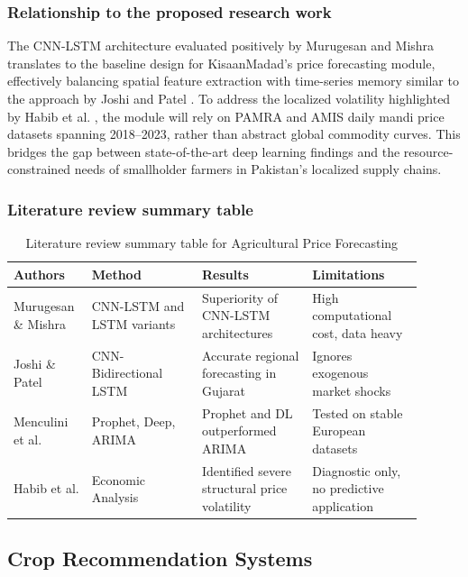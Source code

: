 \documentclass{FastFyp}
\begin{document}
\subsubsection{Relationship to the proposed research work}
The CNN-LSTM architecture evaluated positively by Murugesan and Mishra \cite{murugesan2022forecasting} translates to the baseline design for KisaanMadad's price forecasting module, effectively balancing spatial feature extraction with time-series memory similar to the approach by Joshi and Patel \cite{joshi2022cnn}. To address the localized volatility highlighted by Habib et al. \cite{habib2021impact}, the module will rely on PAMRA and AMIS daily mandi price datasets spanning 2018--2023, rather than abstract global commodity curves. This bridges the gap between state-of-the-art deep learning findings and the resource-constrained needs of smallholder farmers in Pakistan's localized supply chains.

\subsubsection{Literature review summary table}
\begin{table}[htbp]
  \centering
  \caption{Literature review summary table for Agricultural Price Forecasting}
  \label{tab:price_forecasting}
  \begin{tabular}{p{0.15\linewidth} p{0.25\linewidth} p{0.25\linewidth} p{0.25\linewidth}}
    \toprule
    \textbf{Authors} & \textbf{Method} & \textbf{Results} & \textbf{Limitations} \\
    \midrule
    Murugesan \& Mishra \cite{murugesan2022forecasting} & CNN-LSTM and LSTM variants & Superiority of CNN-LSTM architectures & High computational cost, data heavy \\
    Joshi \& Patel \cite{joshi2022cnn} & CNN-Bidirectional LSTM & Accurate regional forecasting in Gujarat & Ignores exogenous market shocks \\
    Menculini et al. \cite{menculini2021comparing} & Prophet, Deep, ARIMA & Prophet and DL outperformed ARIMA & Tested on stable European datasets \\
    Habib et al. \cite{habib2021impact} & Economic Analysis & Identified severe structural price volatility & Diagnostic only, no predictive application \\
    \bottomrule
  \end{tabular}
\end{table}

\subsection{Crop Recommendation Systems}
\end{document}
